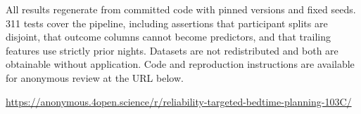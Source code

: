 \documentclass[conference]{IEEEtran}
\begin{document}
All results regenerate from committed code with pinned versions and fixed seeds.
311 tests cover the pipeline, including assertions that participant splits are
disjoint, that outcome columns cannot become predictors, and that trailing
features use strictly prior nights. Datasets are not redistributed and both are
obtainable without application. Code and reproduction instructions are available
for anonymous review at the URL below.

{\sloppy\par\noindent\small
\url{https://anonymous.4open.science/r/reliability-targeted-bedtime-planning-103C/}\par}
\end{document}
